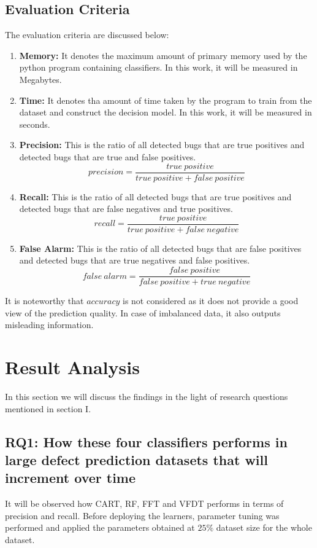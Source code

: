 \documentclass[sigplan]{acmart}\settopmatter{printfolios=true,printccs=false,printacmref=false}
\begin{document}
\subsection{Evaluation Criteria}
The evaluation criteria are discussed below:
\begin{enumerate}
	\item \textbf{Memory: } It denotes the maximum amount of primary memory used by the python program containing classifiers. In this work, it will be measured in Megabytes.
	\item \textbf{Time: } It denotes tha amount of time taken by the program to train from the dataset and construct the decision model. In this work, it will be measured in seconds.
	\item \textbf{Precision: } This is the ratio of all detected bugs that are true positives and detected bugs that are true and false positives.
	\begin{equation}
	precision = \frac{true \ positive}{true\ positive + false \ positive}
	\end{equation}
	\item \textbf{Recall: } This is the ratio of all detected bugs that are true positives and detected bugs that are false negatives and true positives. 
	\begin{equation}
	recall = \frac{true \ positive}{true \ positive + false \ negative}
	\end{equation}
	\item \textbf{False Alarm: } This is the ratio of all detected bugs that are false positives and detected bugs that are true negatives and false positives. 
	\begin{equation}
	false \ alarm = \frac{false \ positive}{false \ positive + true \ negative}
	\end{equation}
\end{enumerate}

It is noteworthy that $accuracy$ is not considered as it does not provide a good view of the prediction quality. In case of imbalanced data, it also outputs misleading information.

\section{Result Analysis}
In this section we will discuss the findings in the light of research questions mentioned in section I.

\subsection{RQ1: How these four classifiers performs in large defect prediction datasets that will increment over time}
It will be observed how CART, RF, FFT and VFDT performs in terms of precision and recall. Before deploying the learners, parameter tuning was performed and applied the parameters obtained at $25\%$ dataset size for the whole dataset.
\end{document}
